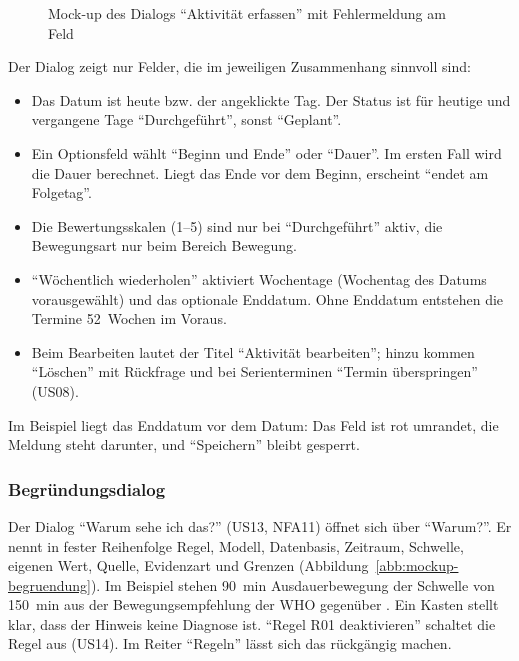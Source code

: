 \begin{figure}[H]
  \caption{Mock-up des Dialogs \enquote{Aktivität erfassen} mit Fehlermeldung am Feld}\label{abb:mockup-aktivitaet}
  \centering
\end{figure}

Der Dialog zeigt nur Felder, die im jeweiligen Zusammenhang sinnvoll sind:
\begin{itemize}
  \item Das Datum ist heute bzw. der angeklickte Tag. Der Status ist für heutige und vergangene Tage \enquote{Durchgeführt}, sonst \enquote{Geplant}.
  \item Ein Optionsfeld wählt \enquote{Beginn und Ende} oder \enquote{Dauer}. Im ersten Fall wird die Dauer berechnet. Liegt das Ende vor dem Beginn, erscheint \enquote{endet am Folgetag}.
  \item Die Bewertungsskalen (1--5) sind nur bei \enquote{Durchgeführt} aktiv, die Bewegungsart nur beim Bereich Bewegung.
  \item \enquote{Wöchentlich wiederholen} aktiviert Wochentage (Wochentag des Datums vorausgewählt) und das optionale Enddatum. Ohne Enddatum entstehen die Termine 52~Wochen im Voraus.
  \item Beim Bearbeiten lautet der Titel \enquote{Aktivität bearbeiten}; hinzu kommen \enquote{Löschen} mit Rückfrage und bei Serienterminen \enquote{Termin überspringen} (US08).
\end{itemize}
Im Beispiel liegt das Enddatum vor dem Datum: Das Feld ist rot umrandet, die Meldung steht darunter, und \enquote{Speichern} bleibt gesperrt.

\subsubsection{Begründungsdialog}\label{sec:dlg-begruendung}
Der Dialog \enquote{Warum sehe ich das?} (US13, NFA11) öffnet sich über \enquote{Warum?}. Er nennt in fester Reihenfolge Regel, Modell, Datenbasis, Zeitraum, Schwelle, eigenen Wert, Quelle, Evidenzart und Grenzen (Abbildung~\ref{abb:mockup-begruendung}). Im Beispiel stehen 90~min Ausdauerbewegung der Schwelle von 150~min aus der Bewegungsempfehlung der \ac{WHO} gegenüber \parencite[S.~1451]{bull2020}. Ein Kasten stellt klar, dass der Hinweis keine Diagnose ist. \enquote{Regel R01 deaktivieren} schaltet die Regel aus (US14). Im Reiter \enquote{Regeln} lässt sich das rückgängig machen.

